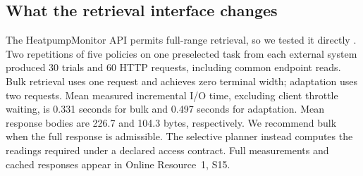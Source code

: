 \subsection{What the retrieval interface changes}
\label{sec:actual-api}
The HeatpumpMonitor API permits full-range retrieval, so we tested it
directly \citep{hpmapi,hpmcode}. Two repetitions of five policies on one
preselected task from each external system produced 30 trials and 60 HTTP
requests, including common endpoint reads. Bulk retrieval uses one request
and achieves zero terminal width; adaptation uses two requests.
Mean measured incremental I/O time, excluding client throttle waiting,
is 0.331 seconds for bulk and 0.497 seconds for adaptation. Mean response bodies
are 226.7 and 104.3 bytes, respectively. We recommend bulk when the full
response is admissible. The selective planner instead computes the readings
required under a declared access contract. Full measurements and cached
responses appear in Online Resource~1, S15.
